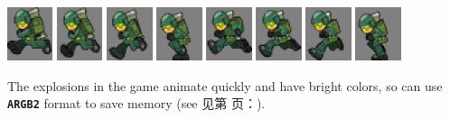\documentclass[10pt]{book}
\newcommand{\mach}[1]{\texttt{\textbf{#1}}}
\newcommand{\xref}[1]{见第 \pageref{#1} 页：\textit{\nameref{#1}}}
\begin{document}
\begin{CJK}{UTF8}{gkai}
\begin{center}
\includegraphics[width=0.1\textwidth]{previews/nightstrike_0-SOLDIER_RUN-00.png}
\includegraphics[width=0.1\textwidth]{previews/nightstrike_0-SOLDIER_RUN-01.png}
\includegraphics[width=0.1\textwidth]{previews/nightstrike_0-SOLDIER_RUN-02.png}
\includegraphics[width=0.1\textwidth]{previews/nightstrike_0-SOLDIER_RUN-03.png}
\includegraphics[width=0.1\textwidth]{previews/nightstrike_0-SOLDIER_RUN-04.png}
\includegraphics[width=0.1\textwidth]{previews/nightstrike_0-SOLDIER_RUN-05.png}
\includegraphics[width=0.1\textwidth]{previews/nightstrike_0-SOLDIER_RUN-06.png}
\includegraphics[width=0.1\textwidth]{previews/nightstrike_0-SOLDIER_RUN-07.png}
\end{center}

The explosions in the game animate quickly and have bright colors, so can
use \mach{ARGB2} format to save memory (see \xref{eightbit}).


\end{CJK}
\end{document}
